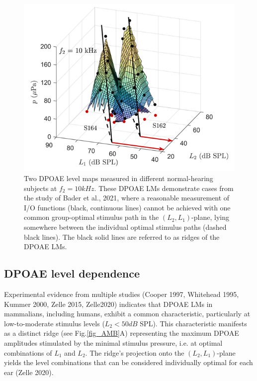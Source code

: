 \documentclass[journal,twoside,web]{ieeecolor2}
\begin{document}
\begin{figure}[ht]
\centerline{\includegraphics[width=\columnwidth]{Fig_0_v1.png}}
\caption{Two DPOAE level maps measured in different normal-hearing subjects at $f_2 = 10 kHz$. These DPOAE LMs demonstrate cases from the study of Bader et al., 2021, where a reasonable measurement of I/O functions (black, continuous lines) cannot be achieved with one common group-optimal stimulus path in the $(L_2, L_1)$-plane, lying somewhere between the individual optimal stimulus paths (dashed black lines). The black solid lines are referred to as ridges of the DPOAE LMs.}
\label{fig_Bdr}
\end{figure}

\subsection{DPOAE level dependence}
Experimental evidence from multiple studies (Cooper 1997, Whitehead 1995, Kummer 2000, Zelle 2015, Zelle2020) indicates that DPOAE LMs in mammalians, including humans, exhibit a common characteristic, particularly at low-to-moderate stimulus levels ($L_2<50 dB$ SPL). This characteristic manifests as a distinct ridge (see Fig.\ref{fig_AMB}A) representing the maximum DPOAE amplitudes stimulated by the minimal stimulus pressure, i.e. at optimal combinations of $L_1$ and $L_2$. The ridge’s projection onto the $(L_2, L_1)$-plane yields the level combinations that can be considered individually optimal for each ear (Zelle 2020).
 
\end{document}
